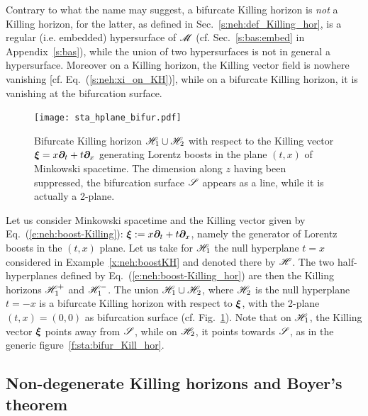 \begin{remark}
Contrary to what the name may suggest, a bifurcate Killing horizon is \emph{not}
a Killing horizon, for the latter, as defined in Sec.~\ref{s:neh:def_Killing_hor},
is a regular (i.e. embedded) hypersurface
of $\mathscr{M}$ (cf. Sec.~\ref{s:bas:embed} in Appendix~\ref{s:bas}), while
the union of two hypersurfaces is not in general a hypersurface. Moreover
on a Killing horizon, the Killing vector field is nowhere vanishing
[cf. Eq.~(\ref{s:neh:xi_on_KH})], while on
a bifurcate Killing horizon, it is vanishing at the bifurcation surface.
\end{remark}

\begin{figure}
\centerline{\texttt{[image: sta\_hplane\_bifur.pdf]}}
\caption[]{\label{f:sta:hplane_bifur} \footnotesize
Bifurcate Killing horizon $\mathscr{H}_1\cup\mathscr{H}_2$ with respect to the Killing vector
$\bm{\xi} = x \bm{\partial}_t + t \bm{\partial}_x$ generating Lorentz boosts in the plane $(t,x)$ of Minkowski spacetime. The dimension along $z$ having been suppressed, the bifurcation
surface $\mathscr{S}$ appears as a line, while it is actually a 2-plane.}
\end{figure}

\begin{example}
\label{x:sta:bif-KH-boost}
Let us consider Minkowski spacetime and the Killing vector given
by Eq.~(\ref{e:neh:boost-Killing}): $\bm{\xi} := x \bm{\partial}_t + t \bm{\partial}_x$, namely
the generator of Lorentz boosts in the $(t,x)$ plane.
Let us take for $\mathscr{H}_1$ the null hyperplane $t=x$
considered in Example~\ref{x:neh:boostKH} and denoted there
by $\mathscr{H}$. The two half-hyperplanes defined by
Eq.~(\ref{e:neh:boost-Killing_hor}) are then the Killing horizons $\mathscr{H}_1^+$ and
$\mathscr{H}_1^-$. The union $\mathscr{H}_1 \cup \mathscr{H}_2$, where $\mathscr{H}_2$ is the null hyperplane $t=-x$ is a bifurcate Killing horizon with respect to $\bm{\xi}$,
with the 2-plane $(t,x)=(0,0)$ as bifurcation surface
(cf. Fig.~\ref{f:sta:hplane_bifur}). Note that on $\mathscr{H}_1$, the Killing vector
$\bm{\xi}$ points away from $\mathscr{S}$, while on $\mathscr{H}_2$, it points towards $\mathscr{S}$,
as in the generic figure~\ref{f:sta:bifur_Kill_hor}.
\end{example}


\subsection{Non-degenerate Killing horizons and Boyer's theorem}
\label{s:sta:non-degenerate_KH}

